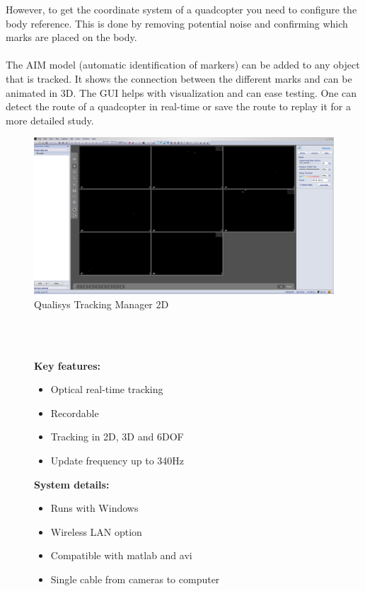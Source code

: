 \newpage
However, to get the coordinate system of a quadcopter you need to configure the body reference. 
This is done by removing potential noise and confirming which marks are placed on the body. \\ 
\\
The AIM model (automatic identification of markers) can be added to any object that is tracked. It shows the connection between the different marks and can be animated in 3D.
The GUI helps with visualization and can ease testing. One can detect the route of a quadcopter in real-time or save the route to replay it for a more detailed study. 
\begin{figure}[h]
          \centering
            \includegraphics[scale = 0.25]{VAPIQ-PICTURES/qtm2d.png}
                \caption{Qualisys Tracking Manager 2D}
                \label{qtm2d}
            \label{dir}
\end{figure}
\\\\
\begin{figure}[h]
     \begin{minipage}[t]{0.45\textwidth}
    \textbf{Key features:}
        \begin{itemize}
            \item Optical real-time tracking
            \item Recordable
            \item Tracking in 2D, 3D and 6DOF
            \item Update frequency up to 340Hz
        \end{itemize}
     \end{minipage}
        \hfill
    \begin{minipage}[t]{0.45\textwidth}
        \textbf{System details:}
        \begin{itemize}
            \item Runs with Windows
            \item Wireless LAN option
            \item Compatible with matlab and avi 
            \item Single cable from cameras to computer
        \end{itemize}
    \end{minipage}
\end{figure}

